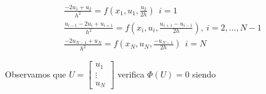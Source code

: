 \begin{align*}
     & \frac{-2u_1 + u_2}{h^2} = f\left( x_1,u_1, \frac{u_2}{2h} \right)\ \ i = 1                                      \\
     & \frac{u_{i-1} - 2u_i + u_{i+1}}{h^2} = f\left(x_i, u_i, \frac{u_{i+1} -u_{i-1}}{2h} \right), \ i = 2,\ldots,N-1 \\
     & \frac{-2u_{N-1} + u_N}{h^2} = f\left( x_N,u_N, \frac{-u_{N-1  }}{2h} \right) \ \ i = N
\end{align*}

Observamos que $U = \begin{bmatrix}
        u_1    \\
        \vdots \\
        u_N
    \end{bmatrix}$ verifica $\Phi(U) = 0$ siendo

